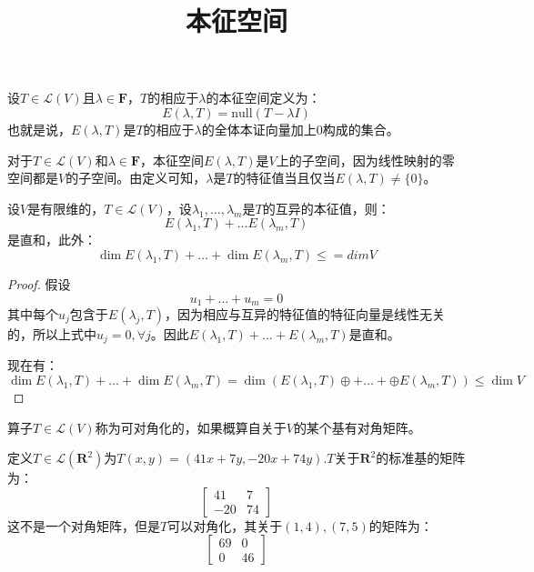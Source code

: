 \documentclass[10pt,a4paper,UTF8]{article}
\date{}
\title{本征空间}
\begin{document}
\maketitle
\begin{definition}
设\(T\in \mathcal{L}(V)\)且\(\lambda \in \mathbf{F}\)，\(T\)的相应于\(\lambda\)的本征空间定义为：
\begin{equation}
\label{eq:1}
E(\lambda,T) = \mathrm{null}(T-\lambda I)
\end{equation}
也就是说，\(E(\lambda,T)\)是\(T\)的相应于\(\lambda\)的全体本证向量加上\(0\)构成的集合。
\end{definition}

对于\(T\in \mathcal{L}(V)\)和\(\lambda \in \mathbf{F}\)，本征空间\(E(\lambda,T)\)是\(V\)上的子空间，因为线性映射的零空间都是\(V\)的子空间。由定义可知，\(\lambda\)是\(T\)的特征值当且仅当\(E(\lambda,T)\neq \{0\}\)。

\begin{theorem}
设\(V\)是有限维的，\(T\in \mathcal{L}(V)\)，设\(\lambda_{1},\ldots ,\lambda_{m}\)是\(T\)的互异的本征值，则：
\begin{equation}
\label{eq:2}
E(\lambda_{1},T) + \ldots E(\lambda_{m},T)
\end{equation}
是直和，此外：
\begin{equation}
\label{eq:3}
\dim E(\lambda_{1},T) + \ldots + \dim E(\lambda_{m},T) \leq =dim V
\end{equation}
\end{theorem}

\begin{proof}
假设
\begin{equation}
\label{eq:4}
u_{1} +\ldots + u_{m} = 0
\end{equation}
其中每个\(u_{j}\)包含于\(E(\lambda_{j},T)\)，因为相应与互异的特征值的特征向量是线性无关的，所以上式中\(u_{j} = 0,\forall j\)。因此\(E(\lambda_{1},T) + \ldots + E(\lambda_{m},T)\)是直和。

现在有：
\begin{equation}
\label{eq:5}
\dim E(\lambda_{1},T) + \ldots + \dim E(\lambda_{m},T) = \dim (E(\lambda_{1},T) \oplus + \ldots + \oplus E(\lambda_{m},T)) \leq \dim V
\end{equation}
\end{proof}
算子\(T\in \mathcal{L}(V)\)称为可对角化的，如果概算自关于\(V\)的某个基有对角矩阵。

\begin{instance}
定义\(T\in \mathcal{L}(\mathbf{R}^{2})\)为\(T(x,y)=(41x+7y,-20x+74y)\).\(T\)关于\(\mathbf{R}^{2}\)的标准基的矩阵为：
\begin{equation}
\label{eq:6}
\begin{bmatrix}
41 & 7 \\
-20 & 74
\end{bmatrix}
\end{equation}
这不是一个对角矩阵，但是\(T\)可以对角化，其关于\((1,4),(7,5)\)的矩阵为：
\begin{equation}
\label{eq:7}
\begin{bmatrix}
69 & 0 \\
0 & 46
\end{bmatrix}
\end{equation}
\end{instance}
\end{document}
